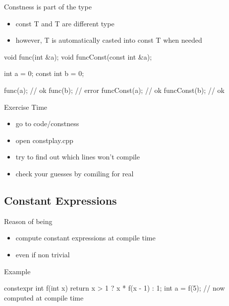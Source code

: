 \begin{frame}[fragile]
  \begin{block}{Constness is part of the type}
    \begin{itemize}
    \item const T and T are different type
    \item however, T is automatically casted into const T when needed
    \end{itemize}
  \end{block}
  \begin{cppcode}
    void func(int &a);
    void funcConst(const int &a);

    int a = 0;
    const int b = 0;

    func(a);      // ok
    func(b);      // error
    funcConst(a); // ok
    funcConst(b); // ok
  \end{cppcode}
\end{frame}

\begin{frame}[fragile]
  \begin{alertblock}{Exercise Time}
    \begin{itemize}
    \item go to code/constness
    \item open constplay.cpp
    \item try to find out which lines won't compile
    \item check your guesses by comiling for real
    \end{itemize}
  \end{alertblock}
\end{frame}

\subsection[constexpr]{Constant Expressions}

\begin{frame}[fragile]
  \begin{block}{Reason of being}
    \begin{itemize}
    \item compute constant expressions at compile time
    \item even if non trivial
    \end{itemize}
  \end{block}
  \pause
  \begin{exampleblock}{Example}
    \begin{cppcode*}{}
      constexpr int f(int x) {
        return x > 1 ? x * f(x - 1) : 1;
      }
      int a = f(5); // now computed at compile time
    \end{cppcode*}
  \end{exampleblock}
\end{frame}

